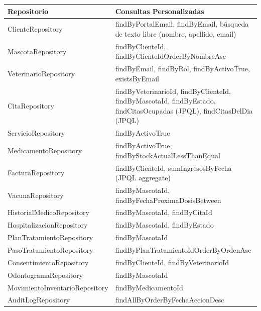 \begin{longtable}{|p{4cm}|p{10cm}|}
\hline
\textbf{Repositorio} & \textbf{Consultas Personalizadas} \\
\hline
ClienteRepository & findByPortalEmail, findByEmail, b\'usqueda de texto libre (nombre, apellido, email) \\
MascotaRepository & findByClienteId, findByClienteIdOrderByNombreAsc \\
VeterinarioRepository & findByEmail, findByRol, findByActivoTrue, existsByEmail \\
CitaRepository & findByVeterinarioId, findByClienteId, findByMascotaId, findByEstado, findCitasOcupadas (JPQL), findCitasDelDia (JPQL) \\
ServicioRepository & findByActivoTrue \\
MedicamentoRepository & findByActivoTrue, findByStockActualLessThanEqual \\
FacturaRepository & findByClienteId, sumIngresosByFecha (JPQL aggregate) \\
VacunaRepository & findByMascotaId, findByFechaProximaDosisBetween \\
HistorialMedicoRepository & findByMascotaId, findByCitaId \\
HospitalizacionRepository & findByMascotaId, findByEstado \\
PlanTratamientoRepository & findByMascotaId \\
PasoTratamientoRepository & findByPlanTratamientoIdOrderByOrdenAsc \\
ConsentimientoRepository & findByClienteId, findByVeterinarioId \\
OdontogramaRepository & findByMascotaId \\
MovimientoInventarioRepository & findByMedicamentoId \\
AuditLogRepository & findAllByOrderByFechaAccionDesc \\
\hline
\end{longtable}
